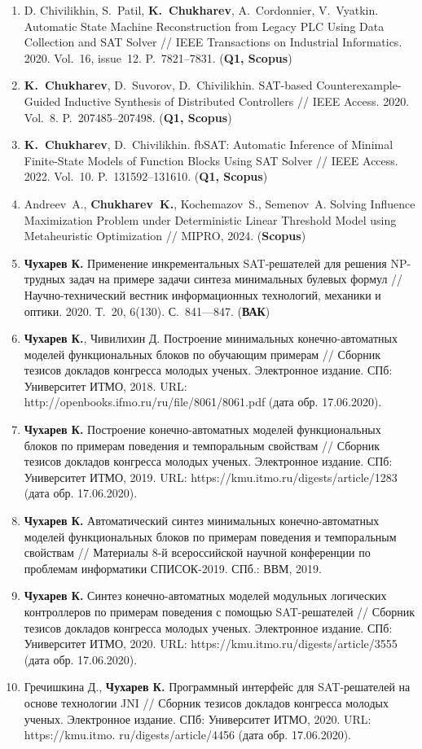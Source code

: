 \begin{enumerate}[left=0pt]
    \item D. Chivilikhin, S.~Patil, \textbf{K.~Chukharev}, A.~Cordonnier, V.~Vyatkin. Automatic State Machine Reconstruction from Legacy PLC Using Data Collection and SAT Solver // IEEE Transactions on Industrial Informatics. 2020. Vol.~16, issue~12. P.~7821–7831. (\textbf{Q1, Scopus})
    \item \textbf{K.~Chukharev}, D.~Suvorov, D.~Chivilikhin. SAT-based Counterexample-Guided Inductive Synthesis of Distributed Controllers // IEEE Access. 2020. Vol.~8. P.~207485–207498. (\textbf{Q1, Scopus})
    \item \textbf{K.~Chukharev}, D.~Chivilikhin. fbSAT: Automatic Inference of Minimal Finite-State Models of Function Blocks Using SAT Solver // IEEE Access. 2022. Vol.~10. P.~131592–131610. (\textbf{Q1, Scopus})
    \item Andreev~A., \textbf{Chukharev~K.}, Kochemazov~S., Semenov~A. Solving Influence Maximization Problem under Deterministic Linear Threshold Model using Metaheuristic Optimization // MIPRO, 2024. (\textbf{Scopus})
    \item \textbf{Чухарев К.} Применение инкрементальных SAT-решателей для решения NP-трудных задач на примере задачи синтеза минимальных булевых формул // Научно-технический вестник информационных технологий, механики и оптики. 2020. Т.~20, 6(130). С.~841—847. (\textbf{ВАК})
    \item \textbf{Чухарев К.}, Чивилихин Д. Построение минимальных конечно-автоматных моделей функциональных блоков по обучающим примерам // Сборник тезисов докладов конгресса молодых ученых. Электронное издание. СПб: Университет ИТМО, 2018. URL: http://openbooks.ifmo.ru/ru/file/8061/8061.pdf (дата обр. 17.06.2020).
    \item \textbf{Чухарев К.} Построение конечно-автоматных моделей функциональных блоков по примерам поведения и темпоральным свойствам // Сборник тезисов докладов конгресса молодых ученых. Электронное издание. СПб: Университет ИТМО, 2019. URL: https://kmu.itmo.ru/digests/article/1283 (дата обр. 17.06.2020).
    \item \textbf{Чухарев К.} Автоматический синтез минимальных конечно-автоматных моделей функциональных блоков по примерам поведения и темпоральным свойствам // Материалы 8-й всероссийской научной конференции по проблемам информатики СПИСОК-2019. СПб.: ВВМ, 2019.
    \item \textbf{Чухарев К.} Синтез конечно-автоматных моделей модульных логических контроллеров по примерам поведения с помощью SAT-решателей // Сборник тезисов докладов конгресса молодых ученых. Электронное издание. СПб: Университет ИТМО, 2020. URL: https://kmu.itmo.ru/digests/article/3555 (дата обр. 17.06.2020).
    \item Гречишкина Д., \textbf{Чухарев К.} Программный интерфейс для SAT-решателей на основе технологии JNI // Сборник тезисов докладов конгресса молодых ученых. Электронное издание. СПб: Университет ИТМО, 2020. URL: https://kmu.itmo. ru/digests/article/4456 (дата обр. 17.06.2020).
\end{enumerate}

